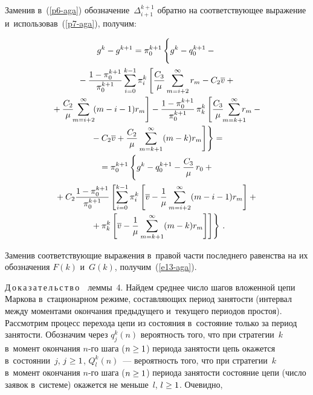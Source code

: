\begin{multicols}{2}
{  
  Заменив в~(\ref{p6-aga}) обозначение~$\Delta_{i+1}^{k+1}$ обратно на 
соответствующее выражение и~использовав~(\ref{p7-aga}), получим: 

\columnbreak

\noindent
  \begin{multline*}
  g^k-g^{k+1} =\pi_0^{k+1}\left\{
  \vphantom{\fr{C_3}{\mu}\sum\limits^\infty_{m=k+1}}
   g^k -q_0^{k+1} -{}\right.\\[-1pt]
  {}-
   \fr{1-\pi_0^{k+1}}{\pi_0^{k+1}}\sum\limits_{i=0}^{k-1} \pi_i^k \left[ 
\fr{C_3}{\mu}\sum\limits^\infty_{m=i+2} r_m -C_2\overline{v} +{}\right.\\[-1pt]
\left.{}+\fr{C_2}{\mu} \!\!\sum\limits^\infty_{m=i+2} \!
(m-i-1) r_m\right]-
   \fr{1-\pi_0^{k+1}}{\pi_0^{k+1}}\,\pi_k^k \left[ \fr{C_3}{\mu}\!\!
   \sum\limits^\infty_{m=k+1}\!\!\! \!r_m -{}\right.\\[-1pt]
 \left.\left.  {}-
C_2\overline{v} +\fr{C_2}{\mu} \sum\limits^\infty_{m=k+1} (m-k) r_m\right]\right\} ={}\\[-1pt]
   {}= \pi_0^{k+1} \left\{ 
   \vphantom{\fr{1}{\mu}\sum\limits^\infty_{m=k+1}}
   g^k-q_0^{k+1}-\fr{C_3}{\mu}\,r_0+{}\right.\\[-1pt]
   {}+
  C_2\fr{1-\pi_0^{k+1}}{\pi_0^{k+1}}\left[ \sum\limits_{i=0}^{k-1} \pi_i^k \left[ 
\overline{v} -\fr{1}{\mu} \sum\limits^\infty_{m=i+2} (m-i-1) r_m\right] +{}\right.\\[-1pt]
  \left.\left.{}+ \pi_k^k\left[ \overline{v} - \fr{1}{\mu}\sum\limits^\infty_{m=k+1} 
(m-k) r_m\right]\right]\right\}\,.
  \end{multline*}
  
  \vspace*{-6pt}
  
  Заменив соответствующие выражения в~правой части последнего равенства 
на их обозначения $F(k)$ и~$G(k)$, получим~(\ref{e13-aga}). 
  
  
  \noindent
  Д\,о\,к\,а\,з\,а\,т\,е\,л\,ь\,с\,т\,в\,о\ \ леммы~4. Найдем среднее число 
шагов вложенной цепи Маркова в~стационарном режиме, составляющих период 
занятости (интервал между моментами окончания предыдущего и~текущего 
периодов простоя). Рассмотрим процесс перехода цепи из состояния 
в~состояние только за период занятости. Обозначим через $q_j^k(n)$ 
вероятность того, что при стратегии~$k$ в~момент окончания $n$-го шага 
($n\hm\geq 1$) периода занятости цепь окажется в~состоянии~$j$, $j\hm\geq1$, 
$Q_l^k(n)$~--- вероятность того, что при стратегии~$k$ в~момент окончания  
$n$-го шага ($n\hm\geq 1$) периода занятости состояние цепи (число заявок 
в~системе) окажется не меньше~$l$, $l\hm\geq 1$. Очевидно,

}
\end{multicols}
